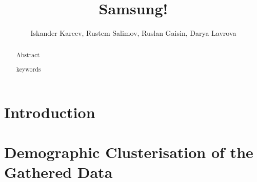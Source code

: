 \documentclass[runningheads,a4paper]{llncs}
\newcommand{\keywords}[1]{\par\addvspace\baselineskip
\noindent\keywordname\enspace\ignorespaces#1}
\begin{document}
\mainmatter  %

\title{Samsung!}




\author{Iskander Kareev, Rustem Salimov, Ruslan Gaisin, Darya Lavrova}
%


%
%

\maketitle


\begin{abstract}
Abstract
\keywords{keywords}
\end{abstract}


\section{Introduction}



\section{Demographic Clusterisation of the Gathered Data}
\end{document}
